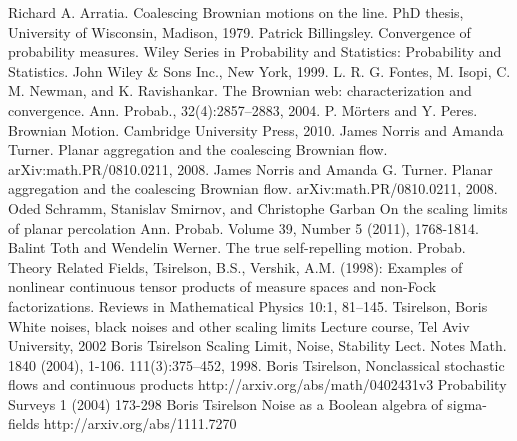 \begin{thebibliography}{99}
 Richard A. Arratia. Coalescing Brownian motions on
  the line. PhD thesis, University of Wisconsin, Madison, 1979.
 Patrick Billingsley. Convergence of probability
  measures. Wiley Series in Probability and Statistics: Probability
  and Statistics. John Wiley \& Sons Inc., New York, 1999.
 L. R. G. Fontes, M. Isopi, C. M. Newman, and
  K. Ravishankar. The Brownian web: characterization and
  convergence. Ann. Probab., 32(4):2857--2883, 2004.
 P. M\"orters and Y. Peres. Brownian Motion.
  Cambridge University Press, 2010.
 James Norris and Amanda
  Turner. Planar aggregation and the coalescing Brownian flow.
  arXiv:math.PR/0810.0211, 2008.
 James Norris and Amanda
  G. Turner. Planar aggregation and the coalescing Brownian
  flow. arXiv:math.PR/0810.0211, 2008.
  Oded Schramm, Stanislav Smirnov, and Christophe Garban
  On the scaling limits of planar percolation
  Ann. Probab. Volume 39, Number 5 (2011), 1768-1814.
 Balint Toth and Wendelin Werner. The true
  self-repelling motion. Probab. Theory Related Fields,
  Tsirelson, B.S., Vershik, A.M. (1998): Examples of nonlinear continuous
  tensor products of measure spaces and non-Fock factorizations. Reviews
  in Mathematical Physics 10:1, 81--145.
  Tsirelson, Boris
  White noises, black noises and other scaling limits
  Lecture course, Tel Aviv University, 2002
  Boris Tsirelson
  Scaling Limit, Noise, Stability
  Lect. Notes Math. 1840 (2004), 1-106.
  111(3):375--452, 1998.
 Boris Tsirelson,
  Nonclassical stochastic flows and continuous products
  http://arxiv.org/abs/math/0402431v3
  Probability Surveys 1 (2004) 173-298
  Boris Tsirelson
  Noise as a Boolean algebra of sigma-fields
  http://arxiv.org/abs/1111.7270
\end{thebibliography}
